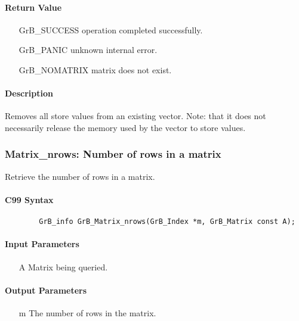 \paragraph{Return Value}

\begin{itemize}[leftmargin=2.1in]
\item[{\sf GrB\_SUCCESS}]   operation completed successfully.
\item[{\sf GrB\_PANIC}]     unknown internal error.
\item[{\sf GrB\_NOMATRIX}]  matrix does not exist.
\end{itemize}

\paragraph{Description}

Removes all store values from an existing vector.  Note: that it does not
necessarily release the memory used by the vector to store values.

\subsubsection{{\sf Matrix\_nrows}: Number of rows in a matrix}

Retrieve the number of rows in a matrix.

\paragraph{C99 Syntax}

\begin{verbatim}
        GrB_info GrB_Matrix_nrows(GrB_Index *m, GrB_Matrix const A);
\end{verbatim}

\paragraph{Input Parameters}

\begin{itemize}[leftmargin=1.1in]
    \item[{\sf A}] Matrix being queried.
\end{itemize}

\paragraph{Output Parameters}
\begin{itemize}[leftmargin=1.1in]
    \item[{\sf m}] The number of rows in the matrix.
\end{itemize}


